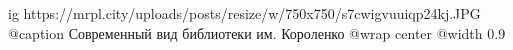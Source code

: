  
 
 
 
 

\ifcmt
  ig https://mrpl.city/uploads/posts/resize/w/750x750/s7cwigvuuiqp24kj.JPG
	@caption Современный вид библиотеки им. Короленко
  @wrap center
  @width 0.9
\fi
